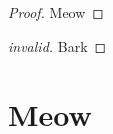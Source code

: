 \documentclass{article}
\newcommand{\sunpacke}{\unpacke{\sfontsym}{\sfont}}
\newcommand{\slete}{\lete{\sfontsym}{\sfont}}
\newcommand{\sfolde}{\folde{\sfontsym}{\sfont}}
\newcommand{\sunfolde}{\unfolde{\sfontsym}{\sfont}}
\newcommand{\sunite}{\unite{\sfontsym}{\sfont}}
\newcommand{\struee}{\truee{\sfontsym}{\sfont}}
\newcommand{\sfalsee}{\falsee{\sfontsym}{\sfont}}
\newcommand{\spaire}{\paire{\sfontsym}{\sfont}}
\begin{document}
\begin{smathpar}
  \sunpacke{\salpha}{\sx}{\svpr}{\seone}

  \telet{\tx}{\te}{\teone}

  \slete{\sx}{\se}{\seone}

  \sfolde{\tmuty{\salpha}{\styone}}{\sty}

  \sunfolde{\seone}

  \sunite

  \struee

  \sfalsee

  \spaire{\seone}{\svtwopr}

  \stx

  \stalphaonepr

  \stxpr[100]
  \stxonepr[5]

  \ctxtyjudg{\tfont}{\tfont{\ectx}}{\tfont{\Gamma}}{\tty}{\tfont{\Gamma}}{\ttypr}

  \rho

  \mapat{\rho}{\talpha}

  \maponeat{\rho}{\talpha}

  \maptwoat{\rho}{\talpha}

  \maprelat{\rho}{\talpha}

  \mapext{\rho}{\talpha}{\tty}

\end{smathpar}

%

\begin{proof}
  Meow
\end{proof}

\begin{proof}[invalid]
  Bark
\end{proof}


\section{Meow}
\end{document}

